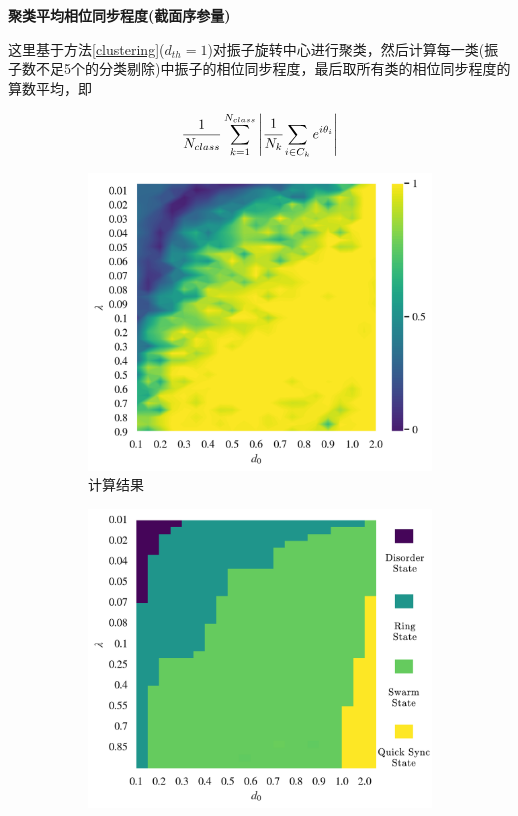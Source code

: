 \documentclass{article}
\begin{document}
\newpage
\noindent\textbf{聚类平均相位同步程度(截面序参量)}

这里基于方法\ref{clustering}($d_{th}=1$)对振子旋转中心进行聚类，然后计算每一类(振子数不足5个的分类剔除)中振子的相位同步程度，最后取所有类的相位同步程度的算数平均，即

$$\frac{1}{N_{class}}\sum_{k=1}^{N_{class}}\left|\cfrac{1}{N_{k}}\sum_{i\in C_{k}}e^{i\theta_i}\right|$$

\vspace{-0.5cm}
\begin{figure}[H]
	\centering
	\begin{subfigure}[b]{0.49\textwidth}
		\includegraphics[width=\textwidth]{./figs/clusteringPhaseSync.png}
		\vspace{-1cm}
		\caption{计算结果}
	\end{subfigure}
	\begin{subfigure}[b]{0.49\textwidth}
		\includegraphics[width=\textwidth]{./figs/subjectiveOp2.png}

\end{subfigure}
\end{figure}
\end{document}
